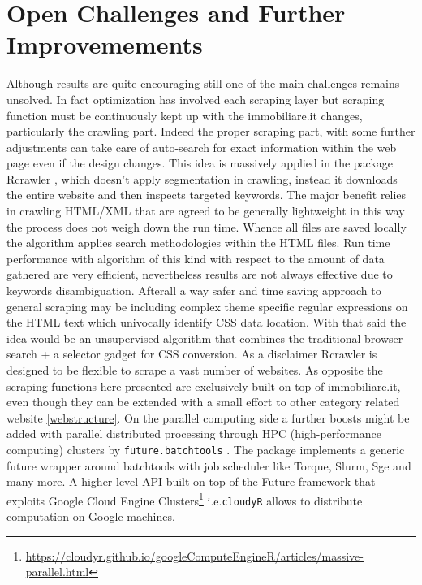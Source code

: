 \documentclass[
  12pt,
  a4paper,
  oneside]{book}
\DeclareRobustCommand{\href}[2]{#2\footnote{\url{#1}}}
\theoremstyle{definition}
\theoremstyle{definition}
\theoremstyle{definition}
\theoremstyle{remark}
\begin{document}
\hypertarget{challenges}{%
\section{Open Challenges and Further Improvemements}\label{challenges}}

Although results are quite encouraging still one of the main challenges remains unsolved. In fact optimization has involved each scraping layer but scraping function must be continuously kept up with the immobiliare.it changes, particularly the crawling part. Indeed the proper scraping part, with some further adjustments can take care of auto-search for exact information within the web page even if the design changes. This idea is massively applied in the package Rcrawler \citet{Rcrawler}, which doesn't apply segmentation in crawling, instead it downloads the entire website and then inspects targeted keywords. The major benefit relies in crawling HTML/XML that are agreed to be generally lightweight in this way the process does not weigh down the run time.
Whence all files are saved locally the algorithm applies search methodologies within the HTML files. Run time performance with algorithm of this kind with respect to the amount of data gathered are very efficient, nevertheless results are not always effective due to keywords disambiguation.
Afterall a way safer and time saving approach to general scraping may be including complex theme specific regular expressions on the HTML text which univocally identify CSS data location. With that said the idea would be an unsupervised algorithm that combines the traditional browser search + a selector gadget for CSS conversion.
As a disclaimer Rcrawler is designed to be flexible to scrape a vast number of websites. As opposite the scraping functions here presented are exclusively built on top of immobiliare.it, even though they can be extended with a small effort to other category related website \ref{webstructure}.
On the parallel computing side a further boosts might be added with parallel distributed processing through HPC (high-performance computing) clusters by \texttt{future.batchtools} \citet{futurebatchtools}. The package implements a generic future wrapper around batchtools with job scheduler like Torque, Slurm, Sge and many more. A higher level API built on top of the Future framework that exploits \href{https://cloudyr.github.io/googleComputeEngineR/articles/massive-parallel.html}{Google Cloud Engine Clusters} i.e.\texttt{cloudyR} allows to distribute computation on Google machines.
\end{document}
